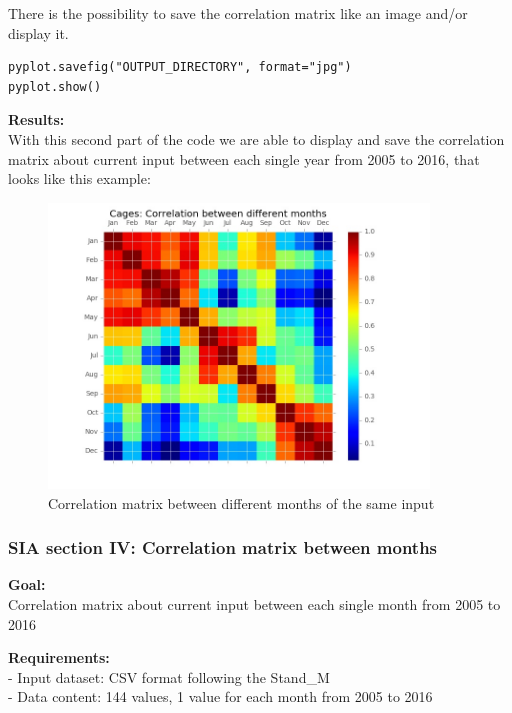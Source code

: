 There is the possibility to save the correlation matrix like an image and/or display it.
\begin{lstlisting}
pyplot.savefig("OUTPUT_DIRECTORY", format="jpg")
pyplot.show()
\end{lstlisting}

\begin{minipage}{0.5\textwidth}
\textbf{Results:} \\
With this second part of the code we are able to display and save the correlation matrix about current input between each single year from 2005 to 2016, that looks like this example:
\end{minipage} \hfill
\begin{minipage}{0.45\textwidth}
\begin{figure}[H]
    \includegraphics[width=0.9\textwidth]{Files/Cages_Months_Matrix.jpg}
    \caption{Correlation matrix between different months of the same input}
\end{figure}
\end{minipage}



\newpage
\subsubsection{SIA section IV: Correlation matrix between months}

\textbf{Goal:}\\
Correlation matrix about current input between each single month from 2005 to 2016

\textbf{Requirements:}\\
- Input dataset: CSV format following the Stand\_M \\
- Data content: 144 values, 1 value for each month from 2005 to 2016


